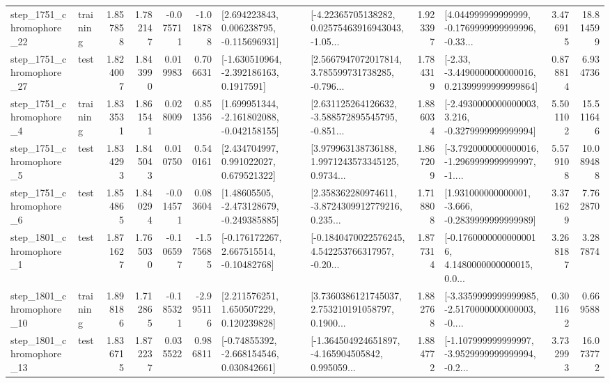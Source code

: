 \begin{tabular}{llrrrrllrlrr}
 step\_1751\_chromophore\_22 &  training &      1.857858 &    1.782147 &     -0.075711 & -1.018788 &    [2.694223843, 0.006238795, -0.115696931] &  [-4.22365705138282, 0.02575463916943043, -1.05... &       1.923397 &  [4.044999999999999, -0.1769999999999996, -0.33... &            3.476915 &         18.814599 \\
 step\_1751\_chromophore\_27 &      test &      1.824007 &    1.843990 &      0.019983 &  0.706631 &     [-1.630510964, -2.392186163, 0.1917591] &  [2.5667947072017814, 3.785599731738285, -0.796... &       1.784319 &  [-2.33, -3.4490000000000016, 0.21399999999999864] &            0.878814 &          6.934736 \\
  step\_1751\_chromophore\_4 &  training &      1.833531 &    1.861541 &      0.028009 &  0.851356 &   [1.699951344, -2.161802088, -0.042158155] &  [2.631125264126632, -3.588572895545795, -0.851... &       1.886034 &  [-2.4930000000000003, 3.216, -0.3279999999999994] &            5.501102 &         15.511646 \\
  step\_1751\_chromophore\_5 &      test &      1.834293 &    1.845043 &      0.010750 &  0.540161 &     [2.434704997, 0.991022027, 0.679521322] &  [3.979963138736188, 1.9971243573345125, 0.9734... &       1.867209 &  [-3.7920000000000016, -1.2969999999999997, -1.... &            5.579108 &         10.089488 \\
  step\_1751\_chromophore\_6 &      test &      1.854865 &    1.840294 &     -0.014571 &  0.083604 &    [1.48605505, -2.473128679, -0.249385885] &  [2.358362280974611, -3.8724309912779216, 0.235... &       1.718808 &   [1.931000000000001, -3.666, -0.2839999999999989] &            3.371629 &          7.762870 \\
  step\_1801\_chromophore\_1 &      test &      1.871627 &    1.765030 &     -0.106597 & -1.575685 &    [-0.176172267, 2.667515514, -0.10482768] &  [-0.1840470022576245, 4.542253766317957, -0.20... &       1.877314 &  [-0.17600000000000016, 4.1480000000000015, 0.0... &            3.268187 &          3.287874 \\
 step\_1801\_chromophore\_10 &  training &      1.898186 &    1.712865 &     -0.185321 & -2.995116 &     [2.211576251, 1.650507229, 0.120239828] &  [3.7360386121745037, 2.753210191058797, 0.1900... &       1.882768 &  [-3.3359999999999985, -2.5170000000000003, -0.... &            0.301162 &          0.669588 \\
 step\_1801\_chromophore\_13 &      test &      1.836715 &    1.872237 &      0.035522 &  0.986811 &    [-0.74855392, -2.668154546, 0.030842661] &  [-1.364504924651897, -4.165904505842, 0.995059... &       1.884772 &  [-1.107999999999997, -3.9529999999999994, -0.2... &            3.732993 &         16.073772 \\

\end{tabular}
